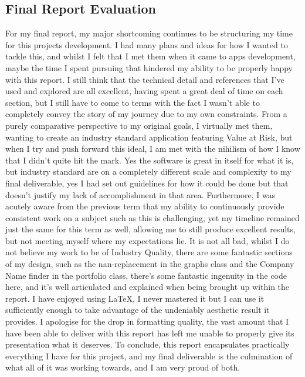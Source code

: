 \documentclass{article}
\begin{document}
\newpage
\subsection{Final Report Evaluation}
For my final report, my major shortcoming continues to be structuring my time for this projects development. I had many plans and ideas for how I wanted to tackle this, and whilst I felt that I met them when it came to apps development, maybe the time I spent pursuing that hindered my ability to be properly happy with this report. I still think that the technical detail and references that I've used and explored are all excellent, having spent a great deal of time on each section, but I still have to come to terms with the fact I wasn't able to completely convey the story of my journey due to my own constraints. From a purely comparative perspective to my original goals, I virtually met them, wanting to create an industry standard application featuring Value at Risk, but when I try and push forward this ideal, I am met with the nihilism of how I know that I didn't quite hit the mark. Yes the software is great in itself for what it is, but industry standard are on a completely different scale and complexity to my final deliverable, yes I had set out guidelines for how it could be done but that doesn't justify my lack of accomplishment in that area. Furthermore, I was acutely aware from the previous term that my ability to continuously provide consistent work on a subject such as this is challenging, yet my timeline remained just the same for this term as well, allowing me to still produce excellent results, but not meeting myself where my expectations lie. It is not all bad, whilst I do not believe my work to be of Industry Quality, there are some fantastic sections of my design, such as the nan-replacement in the graphs class and the Company Name finder in the portfolio class, there's some fantastic ingenuity in the code here, and it's well articulated and explained when being brought up within the report. I have enjoyed using LaTeX, I never mastered it but I can use it sufficiently enough to take advantage of the undeniably aesthetic result it provides. I apologise for the drop in formatting quality, the vast amount that I have been able to deliver with this report has left me unable to properly give its presentation what it deserves. To conclude, this report encapsulates practically everything I have for this project, and my final deliverable is the culmination of what all of it was working towards, and I am very proud of both.
\end{document}
